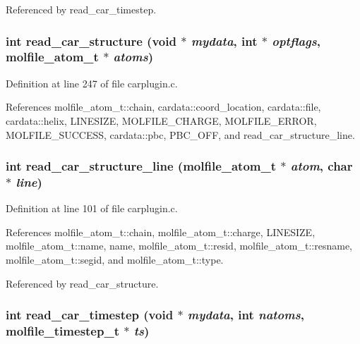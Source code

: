 Referenced by read\_\-car\_\-timestep.
\subsubsection{\setlength{\rightskip}{0pt plus 5cm}int read\_\-car\_\-structure (void $\ast$ {\em mydata}, int $\ast$ {\em optflags}, {\bf molfile\_\-atom\_\-t} $\ast$ {\em atoms})\hspace{0.3cm}{\tt  [static]}}\label{carplugin_8c_a8}




Definition at line 247 of file carplugin.c.

References molfile\_\-atom\_\-t::chain, cardata::coord\_\-location, cardata::file, cardata::helix, LINESIZE, MOLFILE\_\-CHARGE, MOLFILE\_\-ERROR, MOLFILE\_\-SUCCESS, cardata::pbc, PBC\_\-OFF, and read\_\-car\_\-structure\_\-line.
\subsubsection{\setlength{\rightskip}{0pt plus 5cm}int read\_\-car\_\-structure\_\-line ({\bf molfile\_\-atom\_\-t} $\ast$ {\em atom}, char $\ast$ {\em line})\hspace{0.3cm}{\tt  [static]}}\label{carplugin_8c_a5}




Definition at line 101 of file carplugin.c.

References molfile\_\-atom\_\-t::chain, molfile\_\-atom\_\-t::charge, LINESIZE, molfile\_\-atom\_\-t::name, name, molfile\_\-atom\_\-t::resid, molfile\_\-atom\_\-t::resname, molfile\_\-atom\_\-t::segid, and molfile\_\-atom\_\-t::type.

Referenced by read\_\-car\_\-structure.
\subsubsection{\setlength{\rightskip}{0pt plus 5cm}int read\_\-car\_\-timestep (void $\ast$ {\em mydata}, int {\em natoms}, {\bf molfile\_\-timestep\_\-t} $\ast$ {\em ts})\hspace{0.3cm}{\tt  [static]}}\label{carplugin_8c_a9}




